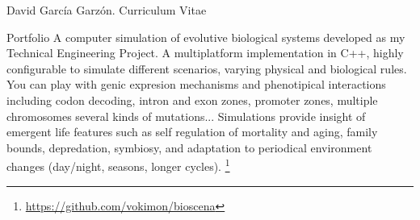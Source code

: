 \documentclass{article}
\begin{document}
\begin{cv}{David García Garzón. Curriculum Vitae}
\begin{cvlist}{Portfolio}
A computer simulation of evolutive biological systems developed as my Technical Engineering Project. A multiplatform implementation in C++, highly configurable to simulate different scenarios, varying physical and biological rules. You can play with genic expresion mechanisms and phenotipical interactions including codon decoding, intron and exon zones, promoter zones, multiple chromosomes several kinds of mutations... Simulations provide insight of emergent life features such as self regulation of mortality and aging, family bounds, depredation, symbiosy, and adaptation to periodical environment changes (day/night, seasons, longer cycles).
\footnote{\href{https://github.com/vokimon/bioscena}{https://github.com/vokimon/bioscena}}

\end{cvlist}


\vspace{2cm}

\end{cv}
\end{document}
